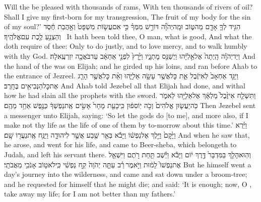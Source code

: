 {Will the \lord\space be pleased with thousands of rams, With ten thousands of rivers of oil? Shall I give my first-born for my transgression, The fruit of my body for the sin of my soul?’}
{הִגִּ֥יד לְךָ֛ אָדָ֖ם מַה\maqqaf טּ֑וֹב וּמָֽה\maqqaf יְהֹוָ֞ה דּוֹרֵ֣שׁ מִמְּךָ֗ כִּ֣י אִם\maqqaf עֲשׂ֤וֹת מִשְׁפָּט֙ וְאַ֣הֲבַת חֶ֔סֶד וְהַצְנֵ֥עַ לֶ֖כֶת עִם\maqqaf אֱלֹהֶֽיךָ׃ \setuma }
{It hath been told thee, O man, what is good, And what the \lord\space doth require of thee: Only to do justly, and to love mercy, and to walk humbly with thy God.}
\newperek
{}
\label{haft_41}
\setcounter{chap}{18}
\setcounter{verse}{46}
{וְיַד\maqqaf יְהֹוָ֗ה הָֽיְתָה֙ אֶל\maqqaf אֵ֣לִיָּ֔הוּ וַיְשַׁנֵּ֖ס מׇתְנָ֑יו וַיָּ֙רׇץ֙ לִפְנֵ֣י אַחְאָ֔ב עַד\maqqaf בֹּאֲכָ֖ה יִזְרְעֶֽאלָה׃}
{And the hand of the \lord\space was on Elijah; and he girded up his loins, and ran before Ahab to the entrance of Jezreel.}
\newperek
{}
{וַיַּגֵּ֤ד אַחְאָב֙ לְאִיזֶ֔בֶל אֵ֛ת כׇּל\maqqaf אֲשֶׁ֥ר עָשָׂ֖ה אֵלִיָּ֑הוּ וְאֵ֨ת כׇּל\maqqaf אֲשֶׁ֥ר הָרַ֛ג אֶת\maqqaf כׇּל\maqqaf הַנְּבִיאִ֖ים בֶּחָֽרֶב׃}
{And Ahab told Jezebel all that Elijah had done, and withal how he had slain all the prophets with the sword.}
{וַתִּשְׁלַ֤ח אִיזֶ֙בֶל֙ מַלְאָ֔ךְ אֶל\maqqaf אֵלִיָּ֖הוּ לֵאמֹ֑ר כֹּֽה\maqqaf יַעֲשׂ֤וּן אֱלֹהִים֙ וְכֹ֣ה יֽוֹסִפ֔וּן כִּֽי\maqqaf כָעֵ֤ת מָחָר֙ אָשִׂ֣ים אֶֽת\maqqaf נַפְשְׁךָ֔ כְּנֶ֖פֶשׁ אַחַ֥ד מֵהֶֽם׃}
{Then Jezebel sent a messenger unto Elijah, saying: ‘So let the gods do [to me], and more also, if I make not thy life as the life of one of them by to-morrow about this time.’}
{וַיַּ֗רְא וַיָּ֙קׇם֙ וַיֵּ֣לֶךְ אֶל\maqqaf נַפְשׁ֔וֹ וַיָּבֹ֕א בְּאֵ֥ר שֶׁ֖בַע אֲשֶׁ֣ר לִיהוּדָ֑ה וַיַּנַּ֥ח אֶֽת\maqqaf נַעֲר֖וֹ שָֽׁם׃}
{And when he saw that, he arose, and went for his life, and came to Beer-sheba, which belongeth to Judah, and left his servant there.}
{וְהֽוּא\maqqaf הָלַ֤ךְ בַּמִּדְבָּר֙ דֶּ֣רֶךְ י֔וֹם וַיָּבֹ֕א וַיֵּ֕שֶׁב תַּ֖חַת רֹ֣תֶם  וַיִּשְׁאַ֤ל אֶת\maqqaf נַפְשׁוֹ֙ לָמ֔וּת וַיֹּ֣אמֶר \legarmeh  רַ֗ב עַתָּ֤ה יְהֹוָה֙ קַ֣ח נַפְשִׁ֔י כִּֽי\maqqaf לֹא\maqqaf ט֥וֹב אָנֹכִ֖י מֵאֲבֹתָֽי׃}
{But he himself went a day’s journey into the wilderness, and came and sat down under a broom-tree; and he requested for himself that he might die; and said: ‘It is enough; now, O \lord, take away my life; for I am not better than my fathers.’}
